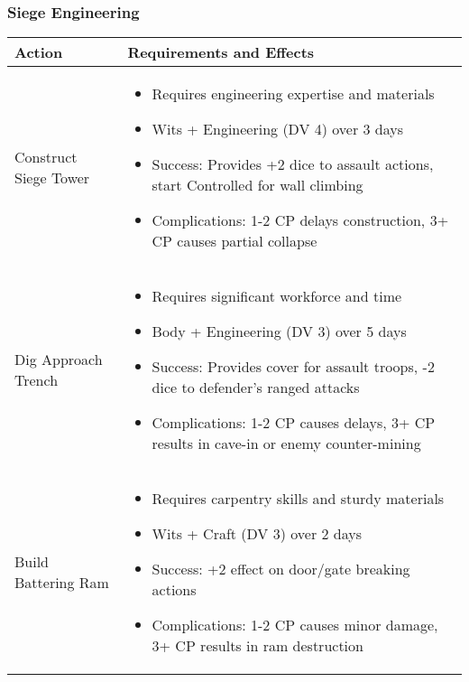 \subsubsection{Siege Engineering}
\begin{longtable}{|>{\raggedright\arraybackslash}p{4cm}|>{\raggedright\arraybackslash}p{8cm}|}
\hline
\textbf{Action} & \textbf{Requirements and Effects} \\
\hline
Construct Siege Tower & 
\begin{itemize}
    \item Requires engineering expertise and materials
    \item Wits + Engineering (DV 4) over 3 days
    \item Success: Provides +2 dice to assault actions, start Controlled for wall climbing
    \item Complications: 1-2 CP delays construction, 3+ CP causes partial collapse
\end{itemize} \\
\hline
Dig Approach Trench & 
\begin{itemize}
    \item Requires significant workforce and time
    \item Body + Engineering (DV 3) over 5 days
    \item Success: Provides cover for assault troops, -2 dice to defender's ranged attacks
    \item Complications: 1-2 CP causes delays, 3+ CP results in cave-in or enemy counter-mining
\end{itemize} \\
\hline
Build Battering Ram & 
\begin{itemize}
    \item Requires carpentry skills and sturdy materials
    \item Wits + Craft (DV 3) over 2 days
    \item Success: +2 effect on door/gate breaking actions
    \item Complications: 1-2 CP causes minor damage, 3+ CP results in ram destruction
\end{itemize} \\
\hline
\end{longtable}

